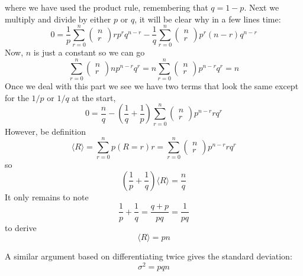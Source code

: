 \documentclass[11pt,a4paper]{scrartcl}
\begin{document}
where we have used the product rule, remembering that $q=1-p$. Next we multiply and divide by either $p$ or $q$, it will be clear why in a few lines time:
\begin{equation}
0=\frac{1}{p}\sum_{r=0}^n \left(\begin{array}{c}n\\r\end{array}\right)rp^rq^{n-r}
-\frac{1}{q}\sum_{r=0}^n \left(\begin{array}{c}n\\r\end{array}\right)p^r(n-r)q^{n-r}
\end{equation}
Now, $n$ is just a constant so we can go
\begin{equation}
\sum_{r=0}^n \left(\begin{array}{c}n\\r\end{array}\right)np^{n-r}q^r=n\sum_{r=0}^n \left(\begin{array}{c}n\\r\end{array}\right)p^{n-r}q^r=n
\end{equation}
Once we deal with this part we see we have two terms that look the same except for the $1/p$ or $1/q$ at the start, 
\begin{equation}
0=\frac{n}{q}-\left(\frac{1}{q}+\frac{1}{p}\right)\sum_{r=0}^n \left(\begin{array}{c}n\\r\end{array}\right)p^{n-r}rq^r
\end{equation}
However, be definition
\begin{equation}
\langle R\rangle=\sum_{r=0}^n p(R=r)r=\sum_{r=0}^n \left(\begin{array}{c}n\\r\end{array}\right)p^{n-r}rq^r
\end{equation}
so
\begin{equation}
\left(\frac{1}{p}+\frac{1}{q}\right)\langle R\rangle=\frac{n}{q}
\end{equation}
It only remains to note
\begin{equation}
\frac{1}{p}+\frac{1}{q}=\frac{q+p}{pq}=\frac{1}{pq}
\end{equation}
to derive
\begin{equation}
\langle R\rangle=pn
\end{equation}

A similar argument based on differentiating twice gives the standard
deviation:
\begin{equation}
\sigma^2=pqn
\end{equation}


\end{document}
